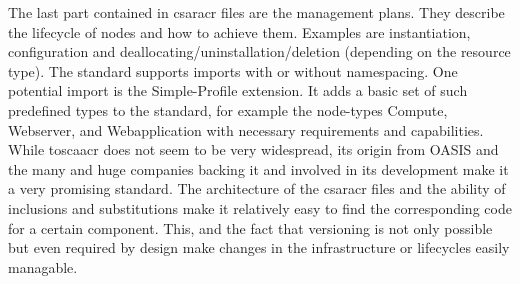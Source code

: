 The last part contained in \gls{csaracr} files are the management plans. They describe the lifecycle of nodes and how to achieve them. Examples are instantiation, configuration and deallocating/uninstallation/deletion (depending on the resource type).
\newline
\newline
The standard supports imports with or without namespacing. One potential import is the Simple-Profile extension.
It adds a basic set of such predefined types to the standard, for example the node-types Compute, Webserver, and Webapplication with necessary requirements and capabilities.
\newline
While \gls{toscaacr} does not seem to be very widespread, its origin from OASIS and the many and huge companies backing it and involved in its development make it a very promising standard.
\newline
The architecture of the \gls{csaracr} files and the ability of inclusions and substitutions make it relatively easy to find the corresponding code for a certain component.
\newline
This, and the fact that versioning is not only possible but even required by design make changes in the infrastructure or lifecycles easily managable.






